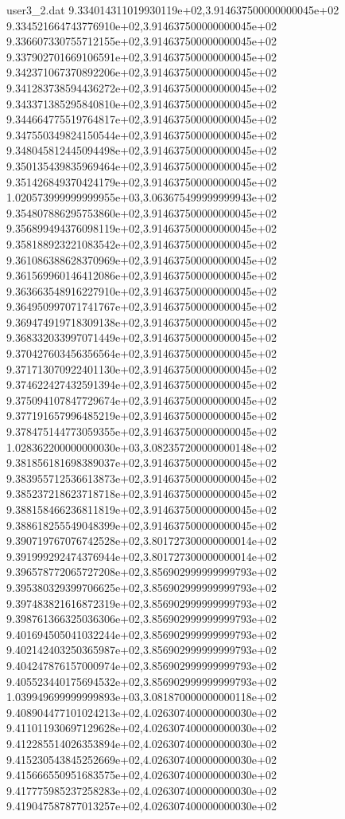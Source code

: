 \begin{filecontents}{user3_2.dat}
9.334014311019930119e+02,3.914637500000000045e+02
9.334521664743776910e+02,3.914637500000000045e+02
9.336607330755712155e+02,3.914637500000000045e+02
9.337902701669106591e+02,3.914637500000000045e+02
9.342371067370892206e+02,3.914637500000000045e+02
9.341283738594436272e+02,3.914637500000000045e+02
9.343371385295840810e+02,3.914637500000000045e+02
9.344664775519764817e+02,3.914637500000000045e+02
9.347550349824150544e+02,3.914637500000000045e+02
9.348045812445094498e+02,3.914637500000000045e+02
9.350135439835969464e+02,3.914637500000000045e+02
9.351426849370424179e+02,3.914637500000000045e+02
1.020573999999999955e+03,3.063675499999999943e+02
9.354807886295753860e+02,3.914637500000000045e+02
9.356899494376098119e+02,3.914637500000000045e+02
9.358188923221083542e+02,3.914637500000000045e+02
9.361086388628370969e+02,3.914637500000000045e+02
9.361569960146412086e+02,3.914637500000000045e+02
9.363663548916227910e+02,3.914637500000000045e+02
9.364950997071741767e+02,3.914637500000000045e+02
9.369474919718309138e+02,3.914637500000000045e+02
9.368332033997071449e+02,3.914637500000000045e+02
9.370427603456356564e+02,3.914637500000000045e+02
9.371713070922401130e+02,3.914637500000000045e+02
9.374622427432591394e+02,3.914637500000000045e+02
9.375094107847729674e+02,3.914637500000000045e+02
9.377191657996485219e+02,3.914637500000000045e+02
9.378475144773059355e+02,3.914637500000000045e+02
1.028362200000000030e+03,3.082357200000000148e+02
9.381856181698389037e+02,3.914637500000000045e+02
9.383955712536613873e+02,3.914637500000000045e+02
9.385237218623718718e+02,3.914637500000000045e+02
9.388158466236811819e+02,3.914637500000000045e+02
9.388618255549048399e+02,3.914637500000000045e+02
9.390719767076742528e+02,3.801727300000000014e+02
9.391999292474376944e+02,3.801727300000000014e+02
9.396578772065727208e+02,3.856902999999999793e+02
9.395380329399706625e+02,3.856902999999999793e+02
9.397483821616872319e+02,3.856902999999999793e+02
9.398761366325036306e+02,3.856902999999999793e+02
9.401694505041032244e+02,3.856902999999999793e+02
9.402142403250365987e+02,3.856902999999999793e+02
9.404247876157000974e+02,3.856902999999999793e+02
9.405523440175694532e+02,3.856902999999999793e+02
1.039949699999999893e+03,3.081870000000000118e+02
9.408904477101024213e+02,4.026307400000000030e+02
9.411011930697129628e+02,4.026307400000000030e+02
9.412285514026353894e+02,4.026307400000000030e+02
9.415230543845252669e+02,4.026307400000000030e+02
9.415666550951683575e+02,4.026307400000000030e+02
9.417775985237258283e+02,4.026307400000000030e+02
9.419047587877013257e+02,4.026307400000000030e+02

\end{filecontents}
